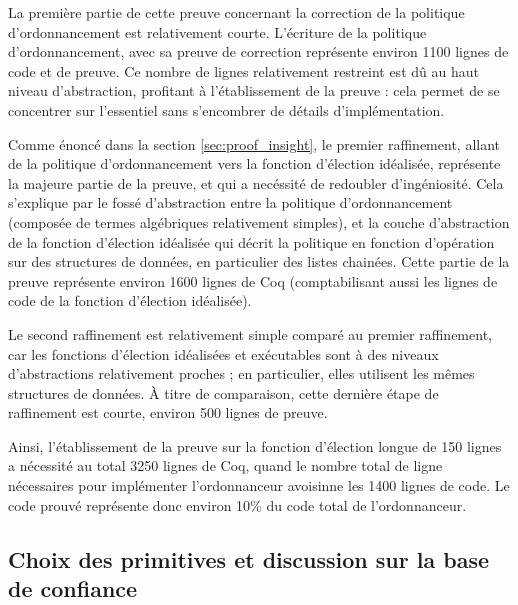			La première partie de cette preuve concernant la correction de la politique d'ordonnancement est relativement courte. L'écriture de la politique d'ordonnancement, avec sa preuve de correction représente environ 1100 lignes de code et de preuve. Ce nombre de lignes relativement restreint est dû au haut niveau d'abstraction, profitant à l'établissement de la preuve : cela permet de se concentrer sur l'essentiel sans s'encombrer de détails d'implémentation.
		
			Comme énoncé dans la section \ref{sec:proof_insight}, le premier raffinement, allant de la politique d'ordonnancement vers la fonction d'élection idéalisée, représente la majeure partie de la preuve, et qui a necéssité de redoubler d'ingéniosité. Cela s'explique par le fossé d'abstraction entre la politique d'ordonnancement (composée de termes algébriques relativement simples), et la couche d'abstraction de la fonction d'élection idéalisée qui décrit la politique en fonction d'opération sur des structures de données, en particulier des listes chainées. Cette partie de la preuve représente environ 1600 lignes de Coq (comptabilisant aussi les lignes de code de la fonction d'élection idéalisée).

			Le second raffinement est relativement simple comparé au premier raffinement, car les fonctions d'élection idéalisées et exécutables sont à des niveaux d'abstractions relativement proches ; en particulier, elles utilisent les mêmes structures de données. À titre de comparaison, cette dernière étape de raffinement est courte, environ 500 lignes de preuve.

			Ainsi, l'établissement de la preuve sur la fonction d'élection longue de 150 lignes a nécessité au total 3250 lignes de Coq, quand le nombre total de ligne nécessaires pour implémenter l'ordonnanceur avoisinne les 1400 lignes de code. Le code prouvé représente donc environ 10\% du code total de l'ordonnanceur.


		\subsection{Choix des primitives et discussion sur la base de confiance}
		\label{sec:interfaceTCB}

